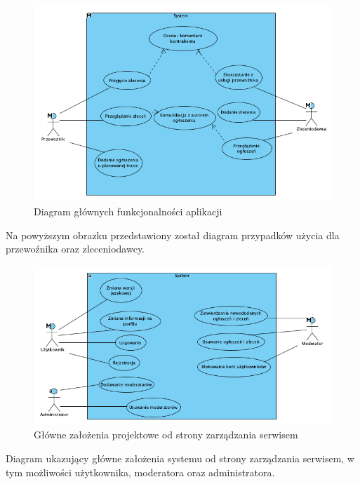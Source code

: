 \begin{figure}[H]
	\centering
		\includegraphics[width=0.9\linewidth]{rozdzial1/glowne_zalozenia.png}
	\caption{Diagram głównych funkcjonalności aplikacji}
	\label{Rys. fig:Diagram głównych funkcjonalności aplikacji}
\end{figure}

Na powyższym obrazku przedstawiony został diagram przypadków użycia dla przewoźnika oraz zleceniodawcy.

\begin{figure}[H]
	\centering
		\includegraphics[width=0.9\linewidth]{rozdzial1/ogolny_schemat.png}
	\caption{Główne założenia projektowe od strony zarządzania serwisem}
	\label{Rys. fig:Główne założenia projektowe od strony zarządzania serwisem}
\end{figure}

Diagram ukazujący główne założenia systemu od strony zarządzania serwisem, w tym możliwości użytkownika, moderatora oraz administratora.

